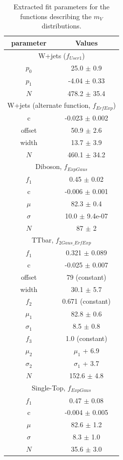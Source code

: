 \begin{table}[!htbp]
	\centering
	\begin{tabular}{||c | c||} 
	 \hline
	  parameter & Values \\
	 \hline \hline
	 \multicolumn{2}{|c|}{W+jets ($f_{User1}$)}\\
	 \hline
	 $p_0$		&	25.0 $\pm$ 0.9\\
	 $p_1$		&	-4.04 $\pm$ 0.33\\
	 $N$		&	478.2 $\pm$ 35.4\\
	 \hline \hline
	 \multicolumn{2}{|c|}{W+jets (alternate function, $f_{ErfExp}$)}\\
	 \hline
	 c 			&	-0.023 $\pm$ 0.002\\
	 offset 	&	50.9 $\pm$ 2.6\\
	 width 		&	13.7 $\pm$ 3.9\\
	 $N$		&	460.1 $\pm$ 34.2\\
	 \hline \hline
	 \multicolumn{2}{|c|}{Diboson, $f_{ExpGaus}$}\\
	 \hline 
	 $f_1$		&	0.45 $\pm$ 0.02\\
	 c 			&	-0.006 $\pm$ 0.001 \\
	 $\mu$		&	82.3 $\pm$ 0.4\\
	 $\sigma$	&	10.0 $\pm$ 9.4e-07\\
	 $N$		&	87 $\pm$ 2\\
	 \hline \hline
	 \multicolumn{2}{|c|}{TTbar, $f_{2Gaus\_ErfExp}$}\\
	 \hline 
	 $f_1$		&	0.321 $\pm$ 0.089\\
	 c 			&	-0.025 $\pm$ 0.007\\
	 offset 	&	79 (constant)\\
	 width 		&	30.1 $\pm$ 5.7\\
	 $f_2$		&	0.671 (constant)\\
	 $\mu_1$	&	82.8 $\pm$ 0.6\\
	 $\sigma_1$	&	8.5 $\pm$ 0.8\\
	 $f_3$		&	1.0 (constant)\\
	 $\mu_2$	&	$\mu_1$ + 6.9 \\
	 $\sigma_2$	&	$\sigma_1$ + 3.7\\
	 $N$		&	152.6 $\pm$ 4.8\\
	 \hline \hline
	 \multicolumn{2}{|c|}{Single-Top, $f_{ExpGaus}$}\\
	 \hline 
	 $f_1$		&	0.47 $\pm$ 0.08\\
	 c 			&	-0.004 $\pm$ 0.005 \\
	 $\mu$		&	82.6 $\pm$ 1.2\\
	 $\sigma$	&	8.3 $\pm$ 1.0\\
	 $N$		&	35.6 $\pm$ 3.0\\
	 \hline 
	\end{tabular}
 	\caption{Extracted fit parameters for the functions describing the $m_{V}$ distributions.}
 	\label{Table:BackgroundEst_fitPars}
\end{table}
